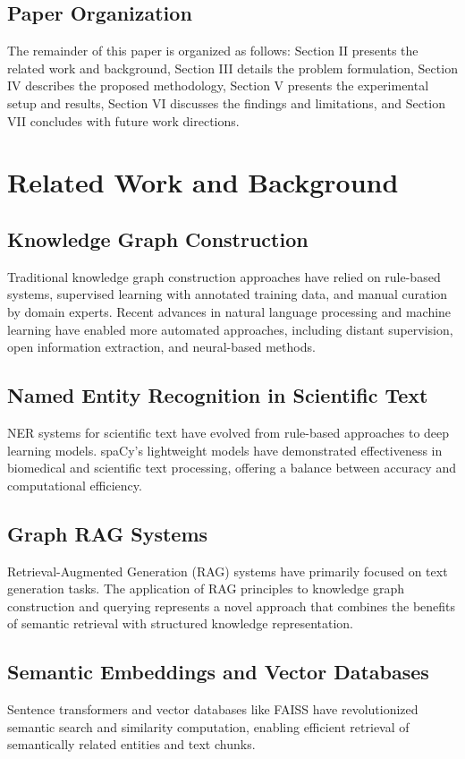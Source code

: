 \documentclass[conference]{IEEEtran}
\begin{document}
\subsection{Paper Organization}
The remainder of this paper is organized as follows: Section II presents the related work and background, Section III details the problem formulation, Section IV describes the proposed methodology, Section V presents the experimental setup and results, Section VI discusses the findings and limitations, and Section VII concludes with future work directions.

\section{Related Work and Background}

\subsection{Knowledge Graph Construction}
Traditional knowledge graph construction approaches have relied on rule-based systems, supervised learning with annotated training data, and manual curation by domain experts. Recent advances in natural language processing and machine learning have enabled more automated approaches, including distant supervision, open information extraction, and neural-based methods.

\subsection{Named Entity Recognition in Scientific Text}
NER systems for scientific text have evolved from rule-based approaches to deep learning models. spaCy's lightweight models have demonstrated effectiveness in biomedical and scientific text processing, offering a balance between accuracy and computational efficiency.

\subsection{Graph RAG Systems}
Retrieval-Augmented Generation (RAG) systems have primarily focused on text generation tasks. The application of RAG principles to knowledge graph construction and querying represents a novel approach that combines the benefits of semantic retrieval with structured knowledge representation.

\subsection{Semantic Embeddings and Vector Databases}
Sentence transformers and vector databases like FAISS have revolutionized semantic search and similarity computation, enabling efficient retrieval of semantically related entities and text chunks.
\end{document}

